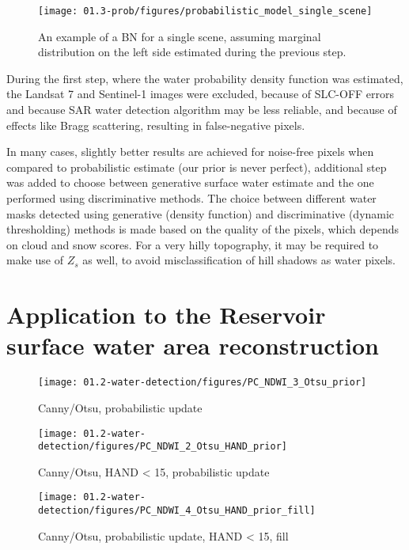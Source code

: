 \begin{figure}[H]
	\centering
	\texttt{[image: 01.3-prob/figures/probabilistic\_model\_single\_scene]}
	\caption{An example of a BN for a single scene, assuming marginal distribution on the left side estimated during the previous step.}
	\label{fig:prob-diagram}
\end{figure}

During the first step, where the water probability density function was estimated, the Landsat 7 and Sentinel-1 images were excluded, because of SLC-OFF errors and because SAR water detection algorithm may be less reliable, and because of effects like Bragg scattering, resulting in false-negative pixels.

In many cases, slightly better results are achieved for noise-free pixels when compared to probabilistic estimate (our prior is never perfect), additional step was added to choose between generative surface water estimate and the one performed using discriminative methods. The choice between different water masks detected using generative (density function) and discriminative (dynamic thresholding) methods is made based on the quality of the pixels, which depends on cloud and snow scores. For a very hilly topography, it may be required to make use of $Z_s$ as well, to avoid misclassification of hill shadows as water pixels.

\section{Application to the Reservoir surface water area reconstruction}

\begin{figure}
	\centering
	\texttt{[image: 01.2-water-detection/figures/PC\_NDWI\_3\_Otsu\_prior]}
	\caption{Canny/Otsu, probabilistic update}
	\label{fig:r1_canny_otsu_nb}
\end{figure}

\begin{figure}
	\centering
	\texttt{[image: 01.2-water-detection/figures/PC\_NDWI\_2\_Otsu\_HAND\_prior]}
	\caption{Canny/Otsu, HAND < 15, probabilistic update}
	\label{fig:r1_canny_otsu_hand_nb}
\end{figure}

\begin{figure}
	\centering
	\texttt{[image: 01.2-water-detection/figures/PC\_NDWI\_4\_Otsu\_HAND\_prior\_fill]}
	\caption{Canny/Otsu, probabilistic update, HAND < 15, fill}
	\label{fig:r1_canny_otsu_hand_nb_fill}
\end{figure}


